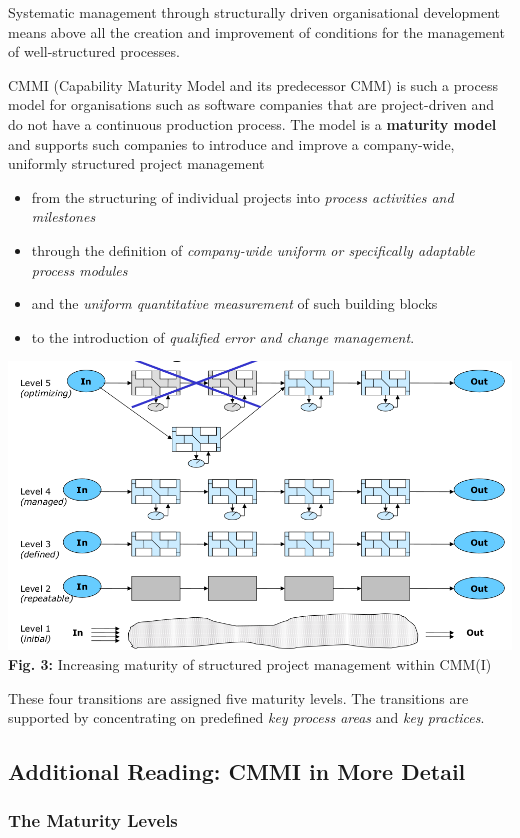 \documentclass[11pt,a4paper]{article}
\begin{document}
Systematic management through structurally driven organisational development
means above all the creation and improvement of conditions for the management
of well-structured processes.

CMMI (Capability Maturity Model and its predecessor CMM) is such a process
model for organisations such as software companies that are project-driven and
do not have a continuous production process. The model is a \textbf{maturity
  model} and supports such companies to introduce and improve a company-wide,
uniformly structured project management
\begin{itemize} 
\item from the structuring of individual projects into \emph{process
  activities and milestones}
\item through the definition of \emph{company-wide uniform or specifically
  adaptable process modules}
\item and the \emph{uniform quantitative measurement} of such building blocks
\item to the introduction of \emph{qualified error and change management}.
\end{itemize}
\begin{center}
  \includegraphics[width=.8\textwidth]{6.png}\\ \textbf{Fig. 3:} Increasing
  maturity of structured project management within CMM(I)
\end{center}
These four transitions are assigned five maturity levels. The transitions are
supported by concentrating on predefined \emph{key process areas} and
\emph{key practices}.

\subsection{Additional Reading: CMMI in More Detail}

\subsubsection{The Maturity Levels}
\end{document}
